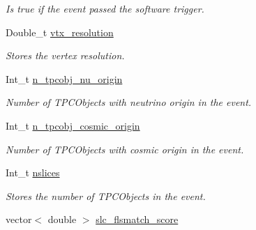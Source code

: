 \begin{DoxyCompactItemize}
\begin{DoxyCompactList}\small\item\em Is true if the event passed the software trigger. \end{DoxyCompactList}\item 
\hypertarget{classUBXSecEvent_aa6c3a4dd22dfd2d39be8fa74b3703230}{Double\-\_\-t \hyperlink{classUBXSecEvent_aa6c3a4dd22dfd2d39be8fa74b3703230}{vtx\-\_\-resolution}}\label{classUBXSecEvent_aa6c3a4dd22dfd2d39be8fa74b3703230}

\begin{DoxyCompactList}\small\item\em Stores the vertex resolution. \end{DoxyCompactList}\item 
\hypertarget{classUBXSecEvent_a0ae9b16a767089e072f0b82da7e071d4}{Int\-\_\-t \hyperlink{classUBXSecEvent_a0ae9b16a767089e072f0b82da7e071d4}{n\-\_\-tpcobj\-\_\-nu\-\_\-origin}}\label{classUBXSecEvent_a0ae9b16a767089e072f0b82da7e071d4}

\begin{DoxyCompactList}\small\item\em Number of T\-P\-C\-Objects with neutrino origin in the event. \end{DoxyCompactList}\item 
\hypertarget{classUBXSecEvent_a64e81de34497d79043b873862c28fd87}{Int\-\_\-t \hyperlink{classUBXSecEvent_a64e81de34497d79043b873862c28fd87}{n\-\_\-tpcobj\-\_\-cosmic\-\_\-origin}}\label{classUBXSecEvent_a64e81de34497d79043b873862c28fd87}

\begin{DoxyCompactList}\small\item\em Number of T\-P\-C\-Objects with cosmic origin in the event. \end{DoxyCompactList}\item 
\hypertarget{classUBXSecEvent_abcf4435958fac040ad4e3c85802eea27}{Int\-\_\-t \hyperlink{classUBXSecEvent_abcf4435958fac040ad4e3c85802eea27}{nslices}}\label{classUBXSecEvent_abcf4435958fac040ad4e3c85802eea27}

\begin{DoxyCompactList}\small\item\em Stores the number of T\-P\-C\-Objects in the event. \end{DoxyCompactList}\item 
\hypertarget{classUBXSecEvent_aac7860c3885997956aabf560254afb42}{vector$<$ double $>$ \hyperlink{classUBXSecEvent_aac7860c3885997956aabf560254afb42}{slc\-\_\-flsmatch\-\_\-score}}\label{classUBXSecEvent_aac7860c3885997956aabf560254afb42}


\end{DoxyCompactItemize}
